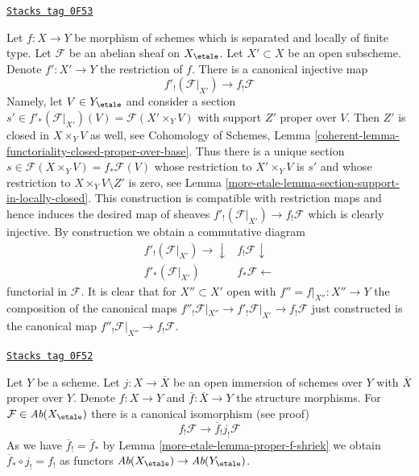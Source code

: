 \begin{remark}

\label{more-etale-remark-covariance-f-shriek-separated}
\href{https://stacks.math.columbia.edu/tag/0F53}{\texttt{Stacks tag 0F53}}

Let $f : X \to Y$ be morphism of schemes which is separated and
locally of finite type. Let $\mathcal{F}$ be an abelian sheaf on $X_\etale$.
Let $X' \subset X$ be an open subscheme. Denote $f' : X' \to Y$
the restriction of $f$. There is a canonical injective map
$$
f'_!(\mathcal{F}|_{X'}) \longrightarrow f_!\mathcal{F}
$$
Namely, let $V \in Y_\etale$ and consider a section
$s' \in f'_*(\mathcal{F}|_{X'})(V) = \mathcal{F}(X' \times_Y V)$
with support $Z'$ proper over $V$. Then $Z'$ is closed in $X \times_Y V$
as well, see Cohomology of Schemes, Lemma
\ref{coherent-lemma-functoriality-closed-proper-over-base}.
Thus there is a unique section
$s \in \mathcal{F}(X \times_Y V) = f_*\mathcal{F}(V)$
whose restriction to $X' \times_Y V$ is $s'$ and whose restriction
to $X \times_Y V \setminus Z'$ is zero, see
Lemma \ref{more-etale-lemma-section-support-in-locally-closed}. This construction is
compatible with restriction maps and hence induces the desired map of
sheaves $f'_!(\mathcal{F}|_{X'}) \to f_!\mathcal{F}$ which is clearly
injective. By construction we obtain a commutative diagram
$$
\begin{array}{cc}f'_!(\mathcal{F}|_{X'}) \longrightarrow\downarrow & f_!\mathcal{F} \downarrow \\ f'_*(\mathcal{F}|_{X'}) & f_*\mathcal{F} \longleftarrow\end{array}
$$
functorial in $\mathcal{F}$. It is clear that for $X'' \subset X'$ open
with $f'' = f|_{X''} : X'' \to Y$ the composition of the canonical maps
$f''_!\mathcal{F}|_{X''} \to f'_!\mathcal{F}|_{X'} \to f_!\mathcal{F}$
just constructed is the canonical map
$f''_!\mathcal{F}|_{X''} \to f_!\mathcal{F}$.
\end{remark}

\begin{lemma}
\label{more-etale-lemma-compactify-f-shriek-separated}
\href{https://stacks.math.columbia.edu/tag/0F52}{\texttt{Stacks tag 0F52}}

Let $Y$ be a scheme. Let $j : X \to \overline{X}$ be an open
immersion of schemes over $Y$ with $\overline{X}$ proper over $Y$.
Denote $f : X \to Y$ and $\overline{f} : \overline{X} \to Y$
the structure morphisms. For $\mathcal{F} \in \textit{Ab}(X_\etale)$
there is a canonical isomorphism (see proof)
$$
f_!\mathcal{F} \longrightarrow \overline{f}_!j_!\mathcal{F}
$$
As we have $\overline{f}_! = \overline{f}_*$ by
Lemma \ref{more-etale-lemma-proper-f-shriek} we obtain
$\overline{f}_* \circ j_! = f_!$ as functors
$\textit{Ab}(X_\etale) \to \textit{Ab}(Y_\etale)$.
\end{lemma}

